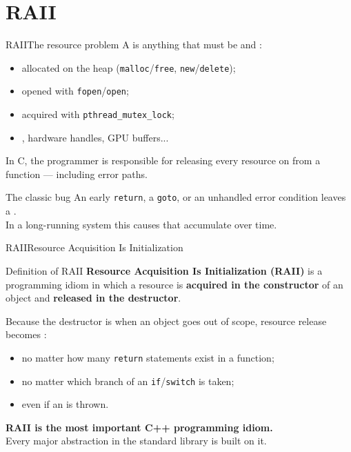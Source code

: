 
\section{RAII}
\graphicspath{{figs/section3/}}

\begin{frame}{RAII}{The resource problem}
	\justifying
	A  is anything that must be  and :
	\begin{itemize}
		\item {} allocated on the heap (\texttt{malloc}/\texttt{free}, \texttt{new}/\texttt{delete});
		\item {} opened with \texttt{fopen}/\texttt{open};
		\item {} acquired with \texttt{pthread\_mutex\_lock};
		\item {}, hardware handles, GPU buffers...
	\end{itemize}
	\bigskip
	In C, the programmer is responsible for releasing every resource on  from a function — including error paths.\\
	\bigskip
	\begin{alertblock}{The classic bug}
		\justifying
		An early \texttt{return}, a \texttt{goto}, or an unhandled error condition leaves a .\\
		In a long-running system this causes  that accumulate over time.
	\end{alertblock}
\end{frame}
\begin{frame}{RAII}{Resource Acquisition Is Initialization}
	\begin{block}{Definition of RAII}
		\justifying
		\textbf{Resource Acquisition Is Initialization (RAII)} is a programming idiom in which a resource is \textbf{acquired in the constructor} of an object and \textbf{released in the destructor}.
	\end{block}
	\justifying
	\bigskip
	Because the destructor is  when an object goes out of scope, resource release becomes :
	\begin{itemize}
		\item no matter how many \texttt{return} statements exist in a function;
		\item no matter which branch of an \texttt{if}/\texttt{switch} is taken;
		\item even if an  is thrown.
	\end{itemize}
	\bigskip
	\begin{block}{}
		\centering
		\textbf{RAII is the most important C++ programming idiom.}\\
		Every major abstraction in the standard library is built on it.
	\end{block}
\end{frame}
